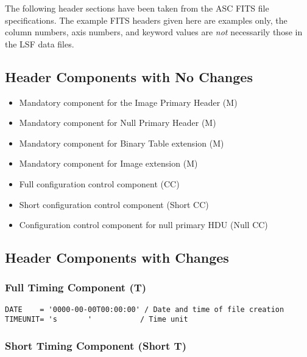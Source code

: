 \documentclass[twoside]{article}
\begin{document}
The following header sections have been taken from the ASC 
FITS file specifications. The example FITS headers given 
here are examples only, the column numbers, axis numbers, and
keyword values are {\it not} necessarily those in the LSF data files. 

\subsection{Header Components with No Changes}

\begin{itemize}

\item{Mandatory component for the Image Primary Header (M)}

\item{Mandatory component for Null Primary Header (M)}

\item{Mandatory component for Binary Table extension (M)}

\item{Mandatory component for Image extension (M)}

\item{Full configuration control component (CC)}

\item{Short configuration control component (Short CC)}

\item{Configuration control component for null primary HDU (Null CC)}

\end{itemize}

\subsection{Header Components with Changes}

\subsubsection{Full Timing Component (T)}

\begin{verbatim}
DATE    = '0000-00-00T00:00:00' / Date and time of file creation
TIMEUNIT= 's       '           / Time unit
\end{verbatim}

\subsubsection{Short Timing Component (Short T)}
\end{document}
